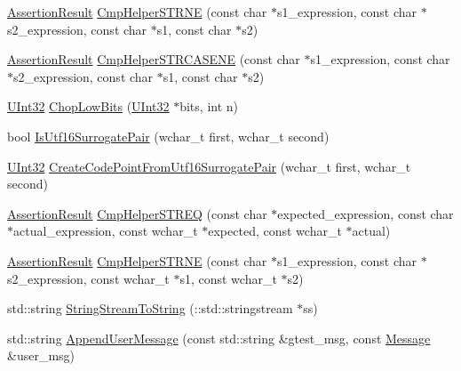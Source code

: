 \begin{DoxyCompactItemize}
\item 
\hyperlink{classtesting_1_1_assertion_result}{Assertion\-Result} \hyperlink{namespacetesting_1_1internal_af2d31c77ce73e1003a64bd7ca3564bbe}{Cmp\-Helper\-S\-T\-R\-N\-E} (const char $\ast$s1\-\_\-expression, const char $\ast$s2\-\_\-expression, const char $\ast$s1, const char $\ast$s2)
\item 
\hyperlink{classtesting_1_1_assertion_result}{Assertion\-Result} \hyperlink{namespacetesting_1_1internal_a7e31d489f06ab8f6a81a7729f0c377e7}{Cmp\-Helper\-S\-T\-R\-C\-A\-S\-E\-N\-E} (const char $\ast$s1\-\_\-expression, const char $\ast$s2\-\_\-expression, const char $\ast$s1, const char $\ast$s2)
\item 
\hyperlink{namespacetesting_1_1internal_a436defbb8e92c8e94e33ebcc86f278ba}{U\-Int32} \hyperlink{namespacetesting_1_1internal_a2c54b453387aa8a18f2f3e09f10b5a7d}{Chop\-Low\-Bits} (\hyperlink{namespacetesting_1_1internal_a436defbb8e92c8e94e33ebcc86f278ba}{U\-Int32} $\ast$bits, int n)
\item 
bool \hyperlink{namespacetesting_1_1internal_a681895f8cc32286211be9889da107394}{Is\-Utf16\-Surrogate\-Pair} (wchar\-\_\-t first, wchar\-\_\-t second)
\item 
\hyperlink{namespacetesting_1_1internal_a436defbb8e92c8e94e33ebcc86f278ba}{U\-Int32} \hyperlink{namespacetesting_1_1internal_ac8ef1bb10cd9e69de939789b759e6bc9}{Create\-Code\-Point\-From\-Utf16\-Surrogate\-Pair} (wchar\-\_\-t first, wchar\-\_\-t second)
\item 
\hyperlink{classtesting_1_1_assertion_result}{Assertion\-Result} \hyperlink{namespacetesting_1_1internal_a5a60e3eb4490e67f00fdb62dd147cd89}{Cmp\-Helper\-S\-T\-R\-E\-Q} (const char $\ast$expected\-\_\-expression, const char $\ast$actual\-\_\-expression, const wchar\-\_\-t $\ast$expected, const wchar\-\_\-t $\ast$actual)
\item 
\hyperlink{classtesting_1_1_assertion_result}{Assertion\-Result} \hyperlink{namespacetesting_1_1internal_a415a953647bbc9469f062dc966061efb}{Cmp\-Helper\-S\-T\-R\-N\-E} (const char $\ast$s1\-\_\-expression, const char $\ast$s2\-\_\-expression, const wchar\-\_\-t $\ast$s1, const wchar\-\_\-t $\ast$s2)
\item 
std\-::string \hyperlink{namespacetesting_1_1internal_a1c063cdfa8269116167e71b477266381}{String\-Stream\-To\-String} (\-::std\-::stringstream $\ast$ss)
\item 
std\-::string \hyperlink{namespacetesting_1_1internal_ae475a090bca903bb222dd389eb189166}{Append\-User\-Message} (const std\-::string \&gtest\-\_\-msg, const \hyperlink{classtesting_1_1_message}{Message} \&user\-\_\-msg)

\end{DoxyCompactItemize}
